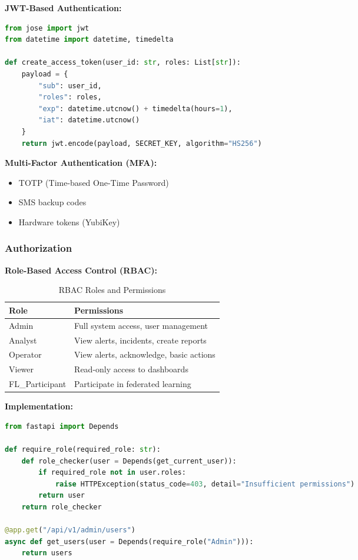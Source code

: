 \documentclass[12pt,a4paper]{article}
\begin{document}
\textbf{JWT-Based Authentication:}
\begin{lstlisting}[language=python]
from jose import jwt
from datetime import datetime, timedelta

def create_access_token(user_id: str, roles: List[str]):
    payload = {
        "sub": user_id,
        "roles": roles,
        "exp": datetime.utcnow() + timedelta(hours=1),
        "iat": datetime.utcnow()
    }
    return jwt.encode(payload, SECRET_KEY, algorithm="HS256")
\end{lstlisting}

\textbf{Multi-Factor Authentication (MFA):}
\begin{itemize}[leftmargin=1cm,itemsep=0pt]
    \item TOTP (Time-based One-Time Password)
    \item SMS backup codes
    \item Hardware tokens (YubiKey)
\end{itemize}

\subsubsection{Authorization}

\textbf{Role-Based Access Control (RBAC):}

\begin{table}[H]
\centering
\small
\begin{tabular}{|l|l|}
\hline
\textbf{Role} & \textbf{Permissions} \\
\hline
Admin & Full system access, user management \\
Analyst & View alerts, incidents, create reports \\
Operator & View alerts, acknowledge, basic actions \\
Viewer & Read-only access to dashboards \\
FL\_Participant & Participate in federated learning \\
\hline
\end{tabular}
\caption{RBAC Roles and Permissions}
\end{table}

\textbf{Implementation:}
\begin{lstlisting}[language=python]
from fastapi import Depends

def require_role(required_role: str):
    def role_checker(user = Depends(get_current_user)):
        if required_role not in user.roles:
            raise HTTPException(status_code=403, detail="Insufficient permissions")
        return user
    return role_checker

@app.get("/api/v1/admin/users")
async def get_users(user = Depends(require_role("Admin"))):
    return users
\end{lstlisting}
\end{document}
